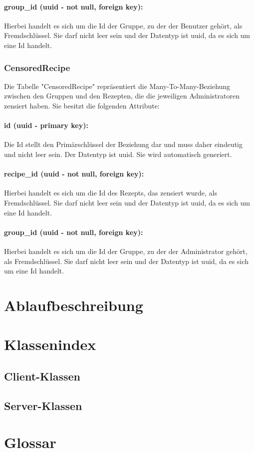 \documentclass[parskip=full]{scrartcl}
\begin{document}
\paragraph{group\_id (uuid - not null, foreign key):} Hierbei handelt es sich um die Id der Gruppe, zu der der Benutzer gehört, als Fremdschlüssel. Sie darf nicht leer sein und der Datentyp ist \Gls{uuid}, da es sich um eine Id handelt.
\newpage
\subsubsection{CensoredRecipe}
Die Tabelle "CensoredRecipe" repräsentiert die Many-To-Many-Beziehung zwischen den Gruppen und den Rezepten, die die jeweiligen Administratoren zensiert haben. Sie besitzt die folgenden Attribute:
\paragraph{id (uuid - primary key):} Die Id stellt den Primärschlüssel der Beziehung dar und muss daher eindeutig und nicht leer sein. Der Datentyp ist \Gls{uuid}. Sie wird automatisch generiert.
\paragraph{recipe\_id (uuid - not null, foreign key):} Hierbei handelt es sich um die Id des Rezepts, das zensiert wurde, als Fremdschlüssel. Sie darf nicht leer sein und der Datentyp ist \Gls{uuid}, da es sich um eine Id handelt.
\paragraph{group\_id (uuid - not null, foreign key):} Hierbei handelt es sich um die Id der Gruppe, zu der der Administrator gehört, als Fremdschlüssel. Sie darf nicht leer sein und der Datentyp ist \Gls{uuid}, da es sich um eine Id handelt.
\newpage

\section{Ablaufbeschreibung}

\section{Klassenindex}
\subsection{Client-Klassen}
\subsection{Server-Klassen}

\section{Glossar}
\printglossary[style=altlist]
\end{document}
